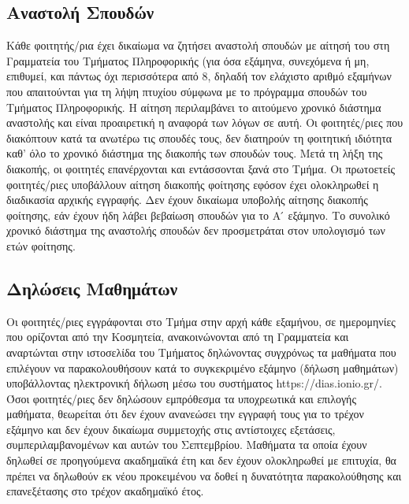 \hypertarget{ux3b1ux3bdux3b1ux3c3ux3c4ux3bfux3bbux3ae-ux3c3ux3c0ux3bfux3c5ux3b4ux3ceux3bd}{%
\subsection{Αναστολή
Σπουδών}\label{ux3b1ux3bdux3b1ux3c3ux3c4ux3bfux3bbux3ae-ux3c3ux3c0ux3bfux3c5ux3b4ux3ceux3bd}}

Κάθε φοιτητής/ρια έχει δικαίωμα να ζητήσει αναστολή σπουδών με αίτησή
του στη Γραμματεία του Τμήματος Πληροφορικής (για όσα εξάμηνα,
συνεχόμενα ή μη, επιθυμεί, και πάντως όχι περισσότερα από 8, δηλαδή τον
ελάχιστο αριθμό εξαμήνων που απαιτούνται για τη λήψη πτυχίου σύμφωνα με
το πρόγραμμα σπουδών του Τμήματος Πληροφορικής. Η αίτηση περιλαμβάνει το
αιτούμενο χρονικό διάστημα αναστολής και είναι προαιρετική η αναφορά των
λόγων σε αυτή. Οι φοιτητές/ριες που διακόπτουν κατά τα ανωτέρω τις
σπουδές τους, δεν διατηρούν τη φοιτητική ιδιότητα καθ' όλο το χρονικό
διάστημα της διακοπής των σπουδών τους. Μετά τη λήξη της διακοπής, οι
φοιτητές επανέρχονται και εντάσσονται ξανά στο Τμήμα. Οι πρωτοετείς
φοιτητές/ριες υποβάλλουν αίτηση διακοπής φοίτησης εφόσον έχει
ολοκληρωθεί η διαδικασία αρχικής εγγραφής. Δεν έχουν δικαίωμα υποβολής
αίτησης διακοπής φοίτησης, εάν έχουν ήδη λάβει βεβαίωση σπουδών για το Α
́ εξάμηνο. Το συνολικό χρονικό διάστημα της αναστολής σπουδών δεν
προσμετράται στον υπολογισμό των ετών φοίτησης.

\hypertarget{ux3b4ux3b7ux3bbux3ceux3c3ux3b5ux3b9ux3c2-ux3bcux3b1ux3b8ux3b7ux3bcux3acux3c4ux3c9ux3bd}{%
\subsection{Δηλώσεις
Μαθημάτων}\label{ux3b4ux3b7ux3bbux3ceux3c3ux3b5ux3b9ux3c2-ux3bcux3b1ux3b8ux3b7ux3bcux3acux3c4ux3c9ux3bd}}

Οι φοιτητές/ριες εγγράφονται στο Τμήμα στην αρχή κάθε εξαμήνου, σε
ημερομηνίες που ορίζονται από την Κοσμητεία, ανακοινώνονται από τη
Γραμματεία και αναρτώνται στην ιστοσελίδα του Τμήματος δηλώνοντας
συγχρόνως τα μαθήματα που επιλέγουν να παρακολουθήσουν κατά το
συγκεκριμένο εξάμηνο (δήλωση μαθημάτων) υποβάλλοντας ηλεκτρονική δήλωση
μέσω του συστήματος https://dias.ionio.gr/. Όσοι φοιτητές/ριες δεν
δηλώσουν εμπρόθεσμα τα υποχρεωτικά και επιλογής μαθήματα, θεωρείται ότι
δεν έχουν ανανεώσει την εγγραφή τους για το τρέχον εξάμηνο και δεν έχουν
δικαίωμα συμμετοχής στις αντίστοιχες εξετάσεις, συμπεριλαμβανομένων και
αυτών του Σεπτεμβρίου. Μαθήματα τα οποία έχουν δηλωθεί σε προηγούμενα
ακαδημαϊκά έτη και δεν έχουν ολοκληρωθεί με επιτυχία, θα πρέπει να
δηλωθούν εκ νέου προκειμένου να δοθεί η δυνατότητα παρακολούθησης και
επανεξέτασης στο τρέχον ακαδημαϊκό έτος.

